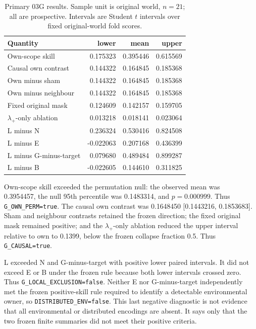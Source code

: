 \documentclass[10pt]{article}
\newcommand{\code}[1]{\texttt{#1}}
\begin{document}
\begin{table}[ht]
\centering
\caption{Primary 03G results. Sample unit is original world, $n=21$; all are prospective. Intervals are Student $t$ intervals over fixed original-world fold scores.}
\begin{tabular}{lrrr}
\toprule
Quantity & lower & mean & upper \\
\midrule
Own-scope skill & 0.175323 & 0.395446 & 0.615569 \\
Causal own contrast & 0.144322 & 0.164845 & 0.185368 \\
Own minus sham & 0.144322 & 0.164845 & 0.185368 \\
Own minus neighbour & 0.144322 & 0.164845 & 0.185368 \\
Fixed original mask & 0.124609 & 0.142157 & 0.159705 \\
$\lambda_+$-only ablation & 0.013218 & 0.018141 & 0.023064 \\
L minus N & 0.236324 & 0.530416 & 0.824508 \\
L minus E & -0.022063 & 0.207168 & 0.436399 \\
L minus G-minus-target & 0.079680 & 0.489484 & 0.899287 \\
L minus B & -0.022605 & 0.144610 & 0.311825 \\
\bottomrule
\end{tabular}
\end{table}

Own-scope skill exceeded the permutation null: the observed mean was 0.3954457, the null 95th percentile was 0.1483314, and $p=0.000999$. Thus \code{G\_OWN\_PERM=true}. The causal own contrast was 0.1648450 [0.1443216, 0.1853683]. Sham and neighbour contrasts retained the frozen direction; the fixed original mask remained positive; and the $\lambda_+$-only ablation reduced the upper interval relative to own to 0.1399, below the frozen collapse fraction 0.5. Thus \code{G\_CAUSAL=true}.

L exceeded N and G-minus-target with positive lower paired intervals. It did not exceed E or B under the frozen rule because both lower intervals crossed zero. Thus \code{G\_LOCAL\_EXCLUSION=false}. Neither E nor G-minus-target independently met the frozen positive-skill rule required to identify a detectable environmental owner, so \code{DISTRIBUTED\_ENV=false}. This last negative diagnostic is not evidence that all environmental or distributed encodings are absent. It says only that the two frozen finite summaries did not meet their positive criteria.
\end{document}
